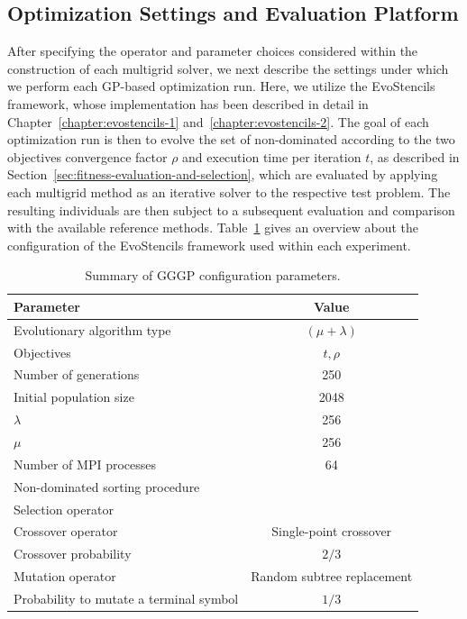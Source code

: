 \subsection{Optimization Settings and Evaluation Platform}
After specifying the operator and parameter choices considered within the construction of each multigrid solver, we next describe the settings under which we perform each GP-based optimization run.
Here, we utilize the EvoStencils framework, whose implementation has been described in detail in Chapter~\ref{chapter:evostencils-1} and~\ref{chapter:evostencils-2}.
The goal of each optimization run is then to evolve the set of non-dominated according to the two objectives convergence factor $\rho$ and execution time per iteration $t$, as described in Section~\ref{sec:fitness-evaluation-and-selection}, which are evaluated by applying each multigrid method as an iterative solver to the respective test problem.
The resulting individuals are then subject to a subsequent evaluation and comparison with the available reference methods. 
Table~\ref{table:gp-parameters} gives an overview about the configuration of the EvoStencils framework used within each experiment.
\begin{table}
	\centering
	\caption{Summary of GGGP configuration parameters.}
	\label{table:gp-parameters}
	\begin{tabular}{l c}
		\toprule
		Parameter & Value \\
		\midrule 
		Evolutionary algorithm type & $(\mu + \lambda)$ \\
		\midrule
		Objectives & $t, \rho$ \\
		\midrule
		Number of generations & 250 \\
		\midrule
		Initial population size & 2048 \\
		\midrule
		$\lambda$ & 256 \\
		\midrule
		$\mu$ & 256 \\
		\midrule
		Number of MPI processes & 64 \\
		\midrule
		Non-dominated sorting procedure & \cite{deb2002fast} \\ 
		\midrule
		Selection operator & \cite{deb2002fast} \\ 
		\midrule
		Crossover operator & Single-point crossover \\
		\midrule
		Crossover probability & $2/3$ \\
		\midrule
		Mutation operator & Random subtree replacement \\
		\midrule 
		Probability to mutate a terminal symbol & $1/3$ \\
		\bottomrule
	\end{tabular}
\end{table}
